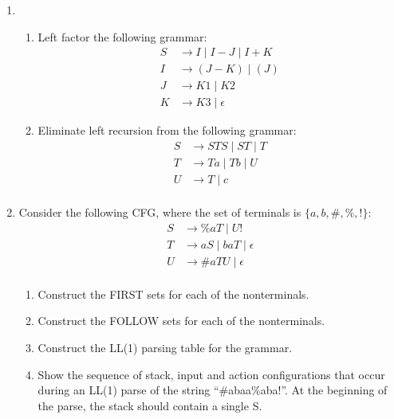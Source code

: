 \documentclass[11pt]{article}
\begin{document}
\begin{enumerate}
  \item  \begin{enumerate}
      \item Left factor the following grammar:
        \begin{equation*}
        \begin{split}
          S &\to I \mid I-J \mid I+K  \\
          I &\to (J-K) \mid (J)  \\
          J &\to K1 \mid K2 \\
          K &\to K3 \mid \epsilon 
        \end{split}
      \end{equation*}
      \item Eliminate left recursion from the following grammar:
        \begin{equation*}
        \begin{split}
          S &\to STS \mid ST \mid T  \\
          T &\to Ta \mid Tb \mid U\\
          U &\to T \mid c \\
        \end{split}
      \end{equation*}
  \end{enumerate}
  \item Consider the following CFG, where the set of terminals is $\{a, b, \#, \%, !\}$:
  \begin{equation*}
    \begin{split}
      S &\to \%aT\mid U!\\
      T &\to aS \mid baT \mid \epsilon \\
      U &\to \#aTU \mid \epsilon \\
    \end{split}
  \end{equation*}
  \begin{enumerate}
    \item Construct the FIRST sets for each of the nonterminals.
    \item Construct the FOLLOW sets for each of the nonterminals.
    \item  Construct the LL(1) parsing table for the grammar.
    \item Show the sequence of stack, input and action configurations that occur during an LL(1) parse of the string “\#abaa\%aba!”. At the beginning of the parse, the stack should contain a single S.


\end{enumerate}
\end{enumerate}
\end{document}

